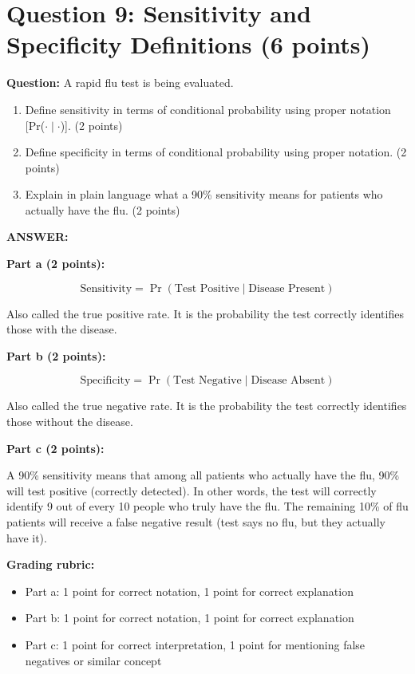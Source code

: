 \documentclass[11pt]{article}
\begin{document}
\vspace{0.3cm}
\noindent\hrulefill

\section*{Question 9: Sensitivity and Specificity Definitions (6 points)}

\textbf{Question:} A rapid flu test is being evaluated.

\begin{enumerate}
    \item[a)] Define sensitivity in terms of conditional probability using proper notation [Pr($\cdot \mid \cdot$)]. (2 points)
    \item[b)] Define specificity in terms of conditional probability using proper notation. (2 points)
    \item[c)] Explain in plain language what a 90\% sensitivity means for patients who actually have the flu. (2 points)
\end{enumerate}

\textbf{ANSWER:}

\textbf{Part a (2 points):}

\[\text{Sensitivity} = \Pr(\text{Test Positive} \mid \text{Disease Present})\]

Also called the true positive rate. It is the probability the test correctly identifies those with the disease.

\textbf{Part b (2 points):}

\[\text{Specificity} = \Pr(\text{Test Negative} \mid \text{Disease Absent})\]

Also called the true negative rate. It is the probability the test correctly identifies those without the disease.

\textbf{Part c (2 points):}

A 90\% sensitivity means that among all patients who actually have the flu, 90\% will test positive (correctly detected). In other words, the test will correctly identify 9 out of every 10 people who truly have the flu. The remaining 10\% of flu patients will receive a false negative result (test says no flu, but they actually have it).

\textbf{Grading rubric:}
\begin{itemize}
    \item Part a: 1 point for correct notation, 1 point for correct explanation
    \item Part b: 1 point for correct notation, 1 point for correct explanation
    \item Part c: 1 point for correct interpretation, 1 point for mentioning false negatives or similar concept
\end{itemize}
\end{document}
